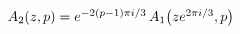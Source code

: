 $\mathop{A_{2}\/}\nolimits\!\left(z,p\right)=e^{-2(p-1)\pi i/3}\mathop{A_{1}\/}%
\nolimits\!\left(ze^{2\pi i/3},p\right)$
